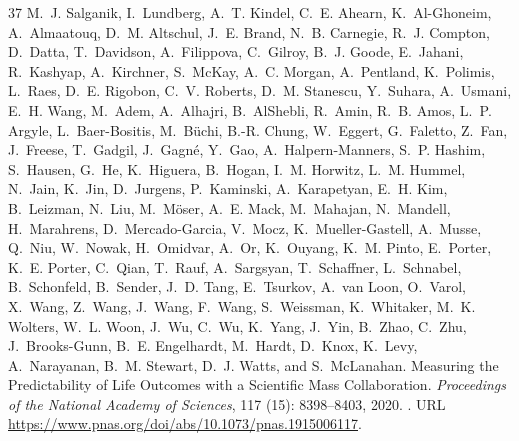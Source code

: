 \documentclass{article} %
\begin{document}
\begin{thebibliography}{37}
M.~J. Salganik, I.~Lundberg, A.~T. Kindel, C.~E. Ahearn, K.~Al-Ghoneim, A.~Almaatouq, D.~M. Altschul, J.~E. Brand, N.~B. Carnegie, R.~J. Compton, D.~Datta, T.~Davidson, A.~Filippova, C.~Gilroy, B.~J. Goode, E.~Jahani, R.~Kashyap, A.~Kirchner, S.~McKay, A.~C. Morgan, A.~Pentland, K.~Polimis, L.~Raes, D.~E. Rigobon, C.~V. Roberts, D.~M. Stanescu, Y.~Suhara, A.~Usmani, E.~H. Wang, M.~Adem, A.~Alhajri, B.~AlShebli, R.~Amin, R.~B. Amos, L.~P. Argyle, L.~Baer-Bositis, M.~Büchi, B.-R. Chung, W.~Eggert, G.~Faletto, Z.~Fan, J.~Freese, T.~Gadgil, J.~Gagné, Y.~Gao, A.~Halpern-Manners, S.~P. Hashim, S.~Hausen, G.~He, K.~Higuera, B.~Hogan, I.~M. Horwitz, L.~M. Hummel, N.~Jain, K.~Jin, D.~Jurgens, P.~Kaminski, A.~Karapetyan, E.~H. Kim, B.~Leizman, N.~Liu, M.~Möser, A.~E. Mack, M.~Mahajan, N.~Mandell, H.~Marahrens, D.~Mercado-Garcia, V.~Mocz, K.~Mueller-Gastell, A.~Musse, Q.~Niu, W.~Nowak, H.~Omidvar, A.~Or, K.~Ouyang, K.~M. Pinto, E.~Porter, K.~E. Porter, C.~Qian, T.~Rauf, A.~Sargsyan, T.~Schaffner, L.~Schnabel,
  B.~Schonfeld, B.~Sender, J.~D. Tang, E.~Tsurkov, A.~van Loon, O.~Varol, X.~Wang, Z.~Wang, J.~Wang, F.~Wang, S.~Weissman, K.~Whitaker, M.~K. Wolters, W.~L. Woon, J.~Wu, C.~Wu, K.~Yang, J.~Yin, B.~Zhao, C.~Zhu, J.~Brooks-Gunn, B.~E. Engelhardt, M.~Hardt, D.~Knox, K.~Levy, A.~Narayanan, B.~M. Stewart, D.~J. Watts, and S.~McLanahan.
\newblock Measuring the {P}redictability of {L}ife {O}utcomes with a {S}cientific {M}ass {C}ollaboration.
\newblock \emph{Proceedings of the National Academy of Sciences}, 117 (15): 8398--8403, 2020.
\newblock {}.
\newblock URL \url{https://www.pnas.org/doi/abs/10.1073/pnas.1915006117}.


\end{thebibliography}
\end{document}
